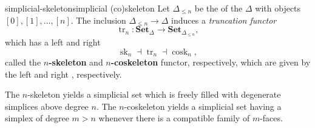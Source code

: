\begin{topic}{simplicial-skeleton}{simplicial (co)skeleton}
    Let $\Delta_{\le n}$ be the  of the  $\Delta$ with objects $[0], [1], \ldots, [n]$. The inclusion $\Delta_{\le n} \to \Delta$ induces a \textit{truncation functor}
    \[ \operatorname{tr}_n : \textbf{Set}_\Delta \to \textbf{Set}_{\Delta_{\le n}} , \]
    which has a left and right 
    \[ \operatorname{sk}_n \dashv \operatorname{tr}_n \dashv \operatorname{cosk}_n , \]
    called the \textbf{$n$-skeleton} and \textbf{$n$-coskeleton} functor, respectively, which are given by the left and right , respectively.
    
    The $n$-skeleton yields a simplicial set which is freely filled with degenerate simplices above degree $n$. The $n$-coskeleton yields a simplicial set having a simplex of degree $m > n$ whenever there is a compatible family of $m$-faces.
\end{topic}
